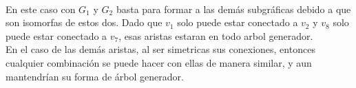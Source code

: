 \documentclass{article}
\begin{document}
\begin{justify}
\begin{tikzpicture}
\end{tikzpicture}
\\ En este caso con $G_1$ y $G_2$ basta para formar a las demás subgráficas debido a que son isomorfas de estos dos.
Dado que $v_1$ solo puede estar conectado a $v_2$ y $v_8$ solo puede estar conectado a $v_7$, esas aristas estaran en todo arbol generador. \\
En el caso de las demás aristas, al ser simetricas sus conexiones, entonces cualquier combinación se puede hacer con ellas de manera similar,
y aun mantendrían su forma de árbol generador.
\end{justify}
\end{document}
